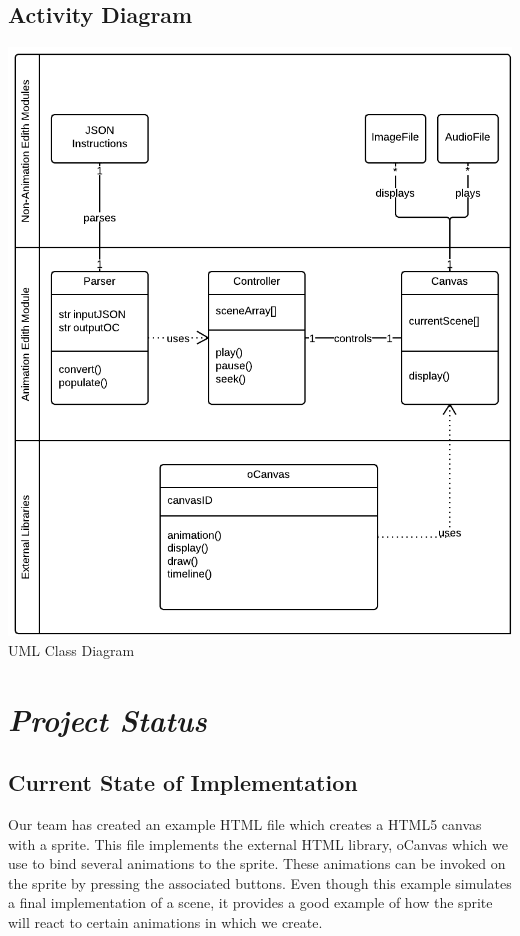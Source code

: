 \documentclass[12pt]{article}
\begin{document}
\subsection{Activity Diagram}
\includegraphics[scale=.45]{AnimationUMLClassDiagram.png}
\\UML Class Diagram
\pagebreak

\section{\emph{Project Status}}
\noindent\subsection{Current State of Implementation}

Our team has created an example HTML file which creates a HTML5 canvas with a sprite. This file implements the external HTML library, oCanvas which we use to bind several animations to the sprite. These animations can be invoked on the sprite by pressing the associated buttons. Even though this example simulates a final implementation of a scene, it provides a good example of how the sprite will react to certain animations in which we create. 
\end{document}
